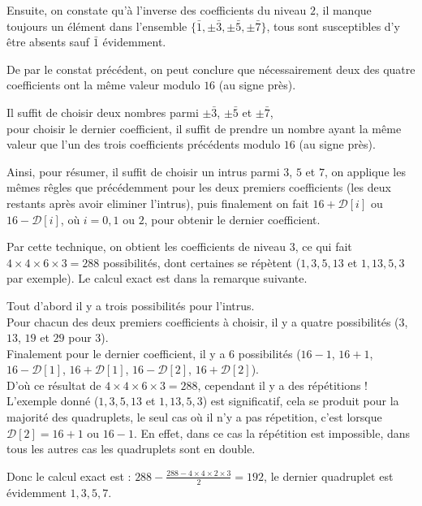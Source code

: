 \documentclass[12pt, a4paper]{memoir}
\begin{document}
  Ensuite, on constate qu'à l'inverse des coefficients du niveau $2$, il manque toujours un élément dans 
  l'ensemble $\{\bar{1},\pm\bar{3},\pm\bar{5},\pm\bar{7}\}$, tous sont susceptibles d'y être absents sauf
  $\bar{1}$ évidemment.
  
  De par le constat précédent, on peut conclure que nécessairement deux des quatre coefficients ont la même 
  valeur modulo $16$ (au signe près).
  
  Il suffit de choisir deux nombres parmi $\pm \bar{3}$, $\pm \bar{5}$ et $\pm \bar{7}$, \\
  pour choisir le dernier coefficient, il suffit de prendre un nombre ayant la même valeur que l'un des 
  trois coefficients précédents modulo $16$ (au signe près).
  
  Ainsi, pour résumer, il suffit de choisir un intrus parmi $3$, $5$ et $7$, on applique les mêmes rêgles
  que précédemment pour les deux premiers coefficients (les deux restants après avoir eliminer l'intrus),
  puis finalement on fait $16 + \mathcal{D}[i]$ ou $16 - \mathcal{D}[i]$, où $i = 0, 1$ ou $2$, pour obtenir
  le dernier coefficient.
  
  Par cette technique, on obtient les coefficients de niveau $3$, ce qui fait $4 \times 4 \times 6 \times 3 = 288$
  possibilités, dont certaines se répètent ($1,3,5,13$ et $1,13,5,3$ par exemple). Le calcul exact est dans la remarque suivante.
  
  \begin{Remarque}
   Tout d'abord il y a trois possibilités pour l'intrus. \\
   Pour chacun des deux premiers coefficients à choisir, il y a quatre possibilités ($3$, $13$, $19$ et $29$
   pour $3$). \\
   Finalement pour le dernier coefficient, il y a $6$ possibilités ($16 - 1$, $16 + 1$,
   $16 - \mathcal{D}[1]$, $16 + \mathcal{D}[1]$, $16 - \mathcal{D}[2]$, $16 + \mathcal{D}[2]$). \\
   D'où ce résultat de $4 \times 4 \times 6 \times 3 = 288$, cependant il y a des répétitions ! \\
   L'exemple donné ($1,3,5,13$ et $1,13,5,3$) est significatif, cela se produit pour la majorité des
   quadruplets, le seul cas où il n'y a pas répetition, c'est lorsque $\mathcal{D}[2] = 16 + 1$ ou $16 - 1$.
   En effet, dans ce cas la répétition est impossible, dans tous les autres cas les quadruplets sont en double.
   
   Donc le calcul exact est : $288 - \frac{288 - 4 \times 4 \times 2 \times 3}{2} = 192$, le dernier quadruplet est 
   évidemment $1,3,5,7$.
  \end{Remarque}
\end{document}
